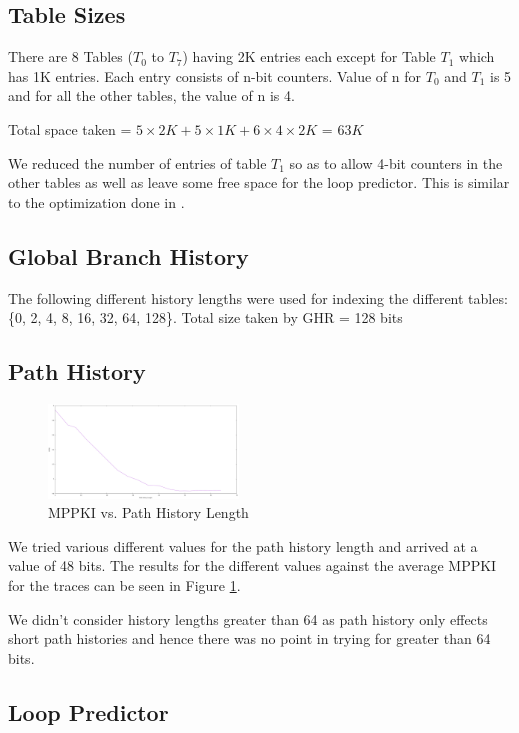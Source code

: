 \documentclass{sig-alternate}
\begin{document}
\subsection{Table Sizes}
There are 8 Tables ($T_0$ to $T_7$) having 2K entries each except for Table
$T_1$ which has 1K entries. Each entry consists of n-bit counters. Value of n
for $T_0$ and $T_1$ is 5 and for all the other tables, the value of n is 4.

Total space taken = $5 \times 2K + 5 \times 1K + 6 \times 4 \times 2K$ = $63K$

We reduced the number of entries of table $T_1$ so as to allow 4-bit counters in
the other tables as well as leave some free space for the loop predictor. This
is similar to the optimization done in \cite{ogehl}.

\subsection{Global Branch History}
The following different history lengths were used for indexing the different
tables: \{0, 2, 4, 8, 16, 32, 64, 128\}. Total size taken by GHR = 128 bits

\subsection{Path History}
\begin{figure}[h]
  \includegraphics[width=0.45\textwidth]{path-hist}
  \caption{MPPKI vs. Path History Length}
  \label{fig-path-hist}
\end{figure}

We tried various different values for the path history length and arrived at a
value of 48 bits. The results for the different values against the average MPPKI
for the traces can be seen in Figure \ref{fig-path-hist}.

We didn't consider history lengths greater than 64 as path history only effects
short path histories and hence there was no point in trying for greater than 64 bits.

\subsection{Loop Predictor}
\end{document}
